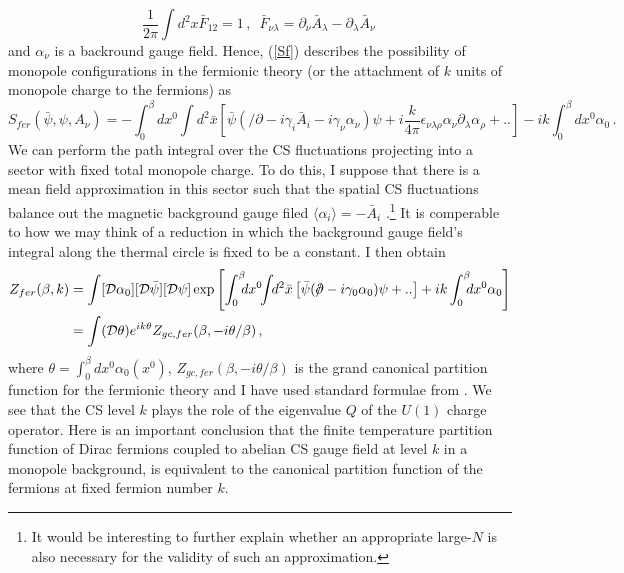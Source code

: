 \documentclass[twoside]{article}
\begin{document}
\begin{equation}
\label{monopole}
\frac{1}{2\pi}\int d^2x \bar{F}_{12}=1\,,\,\,\,\bar{F}_{\nu\lambda}=\partial_\nu \bar{A}_\lambda-\partial_\lambda \bar{A}_\nu\,
\end{equation}
and $\alpha_\nu$ is a backround gauge field.
Hence, (\ref{Sf}) describes the possibility of monopole configurations in the fermionic theory (or the attachment of $k$ units of monopole charge to the fermions) as
\begin{equation}
\label{Sfexp}
S_{fer}(\bar\psi,\psi,A_\nu) =-\int_0^\beta \!\!\!dx^0\!\!\int \!\!d^2\bar{x}\left[\bar\psi(\slash\!\!\!\partial-i\gamma_i\bar{A}_i-i\gamma_\nu\alpha_\nu)\psi+i\frac{k}{4\pi}\epsilon_{\nu\lambda\rho}\alpha_\nu\partial_\lambda\alpha_{\rho}+..\right]-ik\int_0^\beta \!\!\!dx^0 \alpha_0\,.
\end{equation}
We can perform the path integral over the CS fluctuations projecting into a sector with fixed total monopole charge. To do this, I suppose that there is a mean field approximation in this sector such that the spatial CS fluctuations balance out the magnetic background gauge filed  $\langle \alpha_i\rangle =-\bar{A}_i$ \cite{Barkeshli:2014ida}.\footnote{It would be interesting to further explain whether an appropriate large-$N$ is also necessary for the validity of such an approximation.} It is comperable to how we may think of a reduction in which the background gauge field's  integral along the thermal circle is fixed to be a constant. I then obtain
\begin{align}
Z_{fer}(\beta,k)&=\int [{\cal D}\alpha_0][{\cal D}\bar\psi][{\cal D}\psi]\exp{\left[\int_0^\beta \!\!\!dx^0 \!\!\int \!\!d^2\bar{x}\left[\bar\psi(\slash\!\!\!\partial-i\gamma_0\alpha_0)\psi+..\right]+ik\int_0^\beta \!\!\!dx^0\alpha_0\right]}\nonumber \\
\label{DiracCSPFfin}
&=\int ({\cal D}\theta)e^{ik\theta}Z_{gc,fer}(\beta,-i\theta/\beta)\,,
\end{align}
where  $\theta=\int_0^\beta dx^0\alpha_0(x^0)$, $Z_{gc,fer}(\beta,-i\theta/\beta)$ is the grand canonical partition function for the fermionic theory and I have used standard formulae from \cite{ZinnJustin:2002ru}. We see that the CS level $k$ plays the role of the eigenvalue $Q$ of the $U(1)$ charge operator. 
Here is an important conclusion that the finite temperature partition function of Dirac fermions coupled to abelian CS gauge field at level $k$ in a monopole background, is equivalent to the canonical partition function of the fermions at fixed fermion number $k$.
\end{document}
